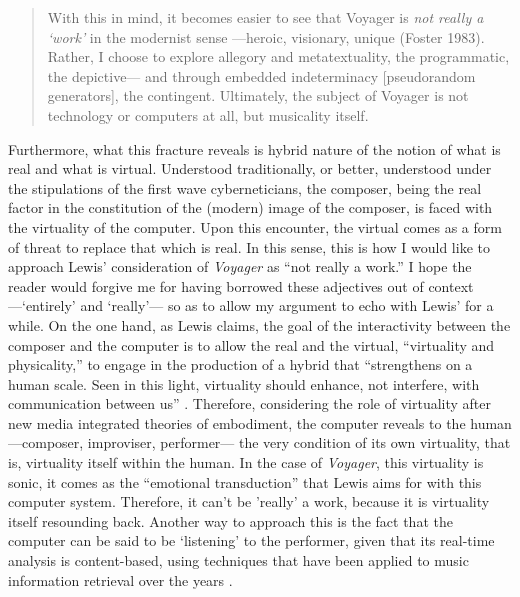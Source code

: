 \begin{quote}
	With this in mind, it becomes easier to see that Voyager is \textit{not really a `work'} in the modernist sense ---heroic, visionary, unique (Foster 1983). Rather, I choose to explore allegory and metatextuality, the programmatic, the depictive--- and through embedded indeterminacy [pseudorandom generators], the contingent. Ultimately, the subject of Voyager is not technology or computers at all, but musicality itself. \im \parencite[110]{Lew99:Int}
\end{quote}

Furthermore, what this fracture reveals is hybrid nature of the notion of what is real and what is virtual. Understood traditionally, or better, understood under the stipulations of the first wave cyberneticians, the composer, being the real factor in the constitution of the (modern) image of the composer, is faced with the virtuality of the computer. Upon this encounter, the virtual comes as a form of threat to replace that which is real. In this sense, this is how I would like to approach Lewis' consideration of \textit{Voyager} as ``not really a work.'' I hope the reader would forgive me for having borrowed these adjectives out of context ---`entirely' and `really'--- so as to allow my argument to echo with Lewis' for a while. On the one hand, as Lewis claims, the goal of the interactivity between the composer and the computer is to allow the real and the virtual, ``virtuality and physicality,'' to engage in the production of a hybrid that ``strengthens on a human scale. Seen in this light, virtuality should enhance, not interfere, with communication between us'' \parencite[110]{Lew99:Int}. Therefore, considering the role of virtuality after new media integrated theories of embodiment, the computer reveals to the human ---composer, improviser, performer--- the very condition of its own virtuality, that is, virtuality itself within the human. In the case of \textit{Voyager}, this virtuality is sonic, it comes as the ``emotional transduction'' that Lewis aims for with this computer system. Therefore, it can't be 'really' a work, because it is virtuality itself resounding back. Another way to approach this is the fact that the computer can be said to be `listening' to the performer, given that its real-time analysis is content-based, using techniques that have been applied to music information retrieval over the years . 

